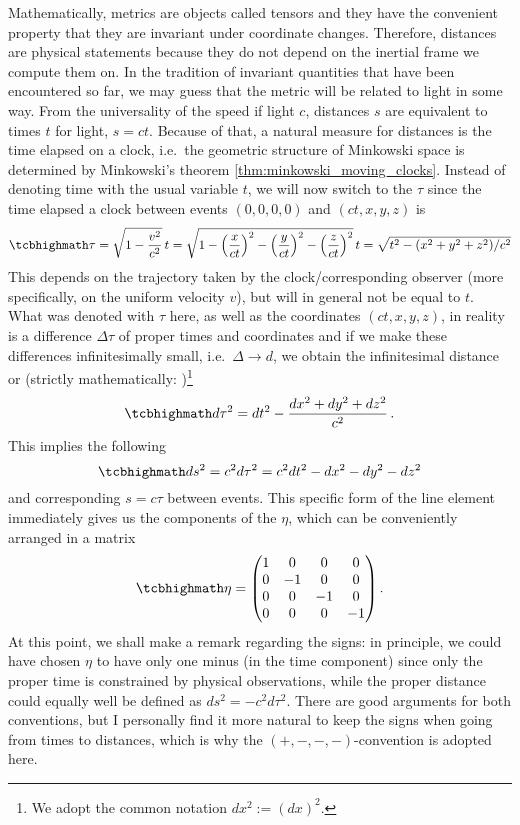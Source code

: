 Mathematically, metrics are objects called tensors and they have the convenient property that they are invariant under coordinate changes. Therefore, distances are physical statements because they do not depend on the inertial frame we compute them on. In the tradition of invariant quantities that have been encountered so far, we may guess that the metric will be related to light in some way. From the universality of the speed if light $c$, distances $s$ are equivalent to times $t$ for light, $s = c t$. Because of that, a natural measure for distances is the time elapsed on a clock, i.e.~the geometric structure of Minkowski space is determined by Minkowski's theorem \ref{thm:minkowski_moving_clocks}. Instead of denoting time with the usual variable $t$, we will now switch to the  $\tau$ since the time elapsed a clock between events $(0, 0, 0, 0)$ and $(ct, x, y, z)$ is
\begin{equation}
\eqbox{
\tau = \sqrt{1 - \frac{v^2}{c^2}} \, t = \sqrt{1 - \qty(\frac{x}{ct})^2 - \qty(\frac{y}{ct})^2 - \qty(\frac{z}{ct})^2} \, t = \sqrt{t^2 - (x^2 + y^2 + z^2) / c^2}
}
\end{equation}
This depends on the trajectory taken by the clock/corresponding observer (more specifically, on the uniform velocity $v$), but will in general not be equal to $t$. What was denoted with $\tau$ here, as well as the coordinates $(ct, x, y, z)$, in reality is a difference $\Delta \tau$ of proper times and coordinates and if we make these differences infinitesimally small, i.e.~$\Delta \rightarrow d$, we obtain the infinitesimal distance or  (strictly mathematically: )\footnote{We adopt the common notation $dx^2 := (dx)^2$.}
\begin{equation}
\eqbox{
d\tau^2 = dt^2 - \frac{dx^2 + dy^2 + dz^2}{c^2}
} \, .
\end{equation}
This implies the following 
\begin{equation}
\eqbox{
ds^2 = c^2 d\tau^2 = c^2 dt^2 - dx^2 - dy^2 - dz^2
}
\end{equation}
and corresponding  $s = c \tau$ between events. This specific form of the line element immediately gives us the components of the  $\eta$, which can be conveniently arranged in a matrix
\begin{equation}
\eqbox{
\eta = \mqty(1 & 0 & 0 & 0 \\ 0 & -1 & 0 & 0 \\ 0 & 0 & -1 & 0 \\ 0 & 0 & 0 & -1)
} \, .
\end{equation}
At this point, we shall make a remark regarding the signs: in principle, we could have chosen $\eta$ to have only one minus (in the time component) since only the proper time is constrained by physical observations, while the proper distance could equally well be defined as $ds^2 = - c^2 d\tau^2$. There are good arguments for both conventions, but I personally find it more natural to keep the signs when going from times to distances, which is why the $(+, -, -, -)$-convention is adopted here.\\


